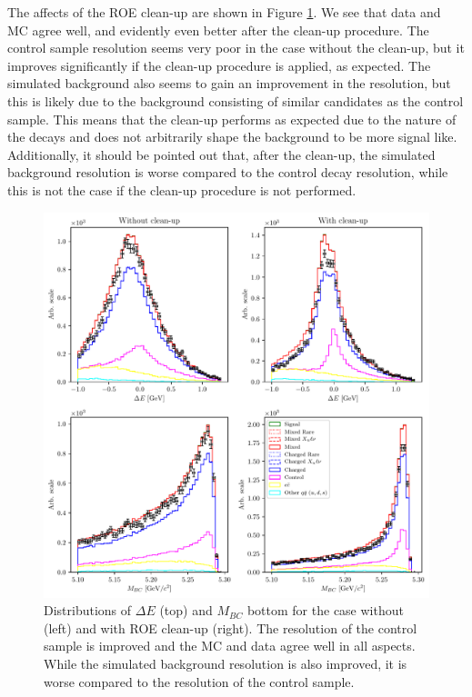 The affects of the ROE clean-up are shown in Figure \ref{fig:roe_val}. We see that data and MC agree well, and evidently even better after the clean-up procedure. The control sample resolution seems very poor in the case without the clean-up, but it improves significantly if the clean-up procedure is applied, as expected. The simulated background also seems to gain an improvement in the resolution, but this is likely due to the background consisting of similar candidates as the control sample. This means that the clean-up performs as expected due to the nature of the decays and does not arbitrarily shape the background to be more signal like. Additionally, it should be pointed out that, after the clean-up, the simulated background resolution is worse compared to the control decay resolution, while this is not the case if the clean-up procedure is not performed.
\begin{figure}[H]
\centering
\captionsetup{width=0.8\linewidth}
\includegraphics[width=\linewidth]{fig/roe_val}
\caption{Distributions of $\Delta E$ (top) and $M_{BC}$ bottom for the case without (left) and with ROE clean-up (right). The resolution of the control sample is improved and the MC and data agree well in all aspects. While the simulated background resolution is also improved, it is worse compared to the resolution of the control sample.}
\label{fig:roe_val}
\end{figure}

